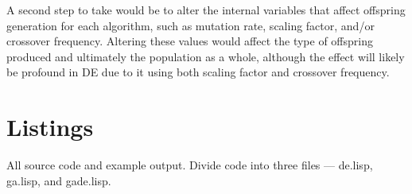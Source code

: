 \documentclass{sig-alternate}
\begin{document}
A second step to take would be to alter the internal variables that affect offspring generation for each algorithm, such as mutation rate, scaling factor, and/or crossover frequency.  Altering these values would affect the type of offspring produced and ultimately the population as a whole, although the effect will likely be profound in DE due to it using both scaling factor and crossover frequency.






\section{Listings}
All source code and example output. \cite{DEMO}  Divide code into three files
--- de.lisp, ga.lisp, and gade.lisp. \cite {LOL}
\end{document}
